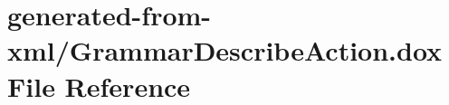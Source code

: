 \hypertarget{GrammarDescribeAction_8dox}{}\section{generated-\/from-\/xml/\+Grammar\+Describe\+Action.dox File Reference}
\label{GrammarDescribeAction_8dox}
